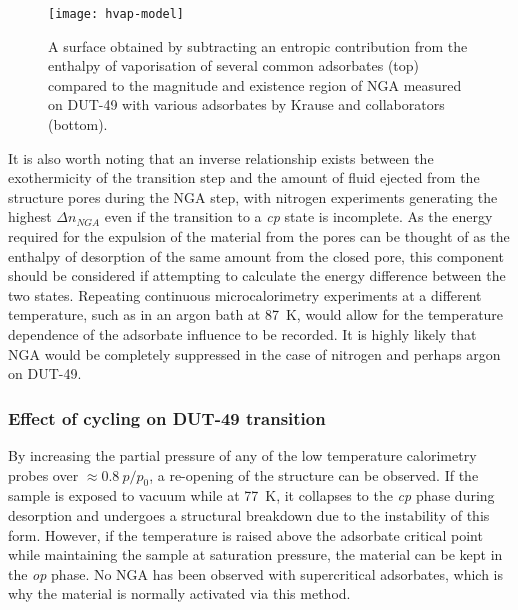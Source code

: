 \begin{figure}[htb]
    \centering
    \texttt{[image: hvap-model]}%
    \caption{
        A surface obtained by subtracting an entropic 
        contribution from the enthalpy of vaporisation of 
        several common adsorbates (top) compared to the 
        magnitude and existence region of \gls{NGA} measured on 
        DUT-49 with various adsorbates by Krause and 
        collaborators (bottom).
    }\label{dut:fig:hvap-model}
\end{figure}

It is also worth noting that an inverse relationship exists 
between the exothermicity of the transition step and the 
amount of fluid ejected from the structure pores during the \gls{NGA} 
step, with nitrogen experiments generating the highest \(\Delta n_{NGA}\)
even if the transition to a \textit{cp} state is incomplete.
As the energy required for the expulsion of the material from the 
pores can be thought of as the enthalpy of desorption of the same amount
from the closed pore, this component should be considered if 
attempting to calculate the energy difference between the two states.
Repeating continuous microcalorimetry experiments at a different 
temperature, such as in an argon bath at \SI{87}{\kelvin}, would 
allow for the temperature dependence of the adsorbate influence 
to be recorded. It is highly likely that \gls{NGA} would be completely 
suppressed in the case of nitrogen and perhaps argon on DUT-49.

\subsubsection{Effect of cycling on DUT-49 transition}

By increasing the partial pressure of any of the low temperature 
calorimetry probes over \(\approx 0.8~p/p_0\), a re-opening
of the structure can be observed. If the sample is exposed to 
vacuum while at \SI{77}{\kelvin}, it collapses to the \textit{cp}
phase during desorption and undergoes a structural breakdown 
due to the instability of this form. However, if the temperature 
is raised above the adsorbate critical point while maintaining the
sample at saturation pressure, the material can be kept in the 
\textit{op} phase. No \gls{NGA} has been observed with supercritical 
adsorbates, which is why the material is normally activated via
this method. 

